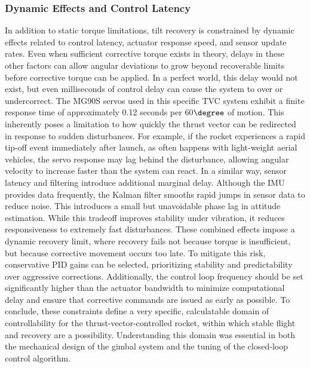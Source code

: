 \subsubsection{Dynamic Effects and Control Latency}

In addition to static torque limitations, tilt recovery is constrained by dynamic effects related to control latency, actuator response speed, and sensor update rates. Even when sufficient corrective torque exists in theory, delays in these other factors can allow angular deviations to grow beyond recoverable limits before corrective torque can be applied. In a perfect world, this delay would not exist, but even milliseconds of control delay can cause the system to over or undercorrect. 
The MG90S servos used in this specific TVC system exhibit a finite response time of approximately 0.12 seconds per 60$\degree$ of motion. This inherently poses a limitation to how quickly the thrust vector can be redirected in response to sudden disturbances. For example, if the rocket experiences a rapid tip-off event immediately after launch, as often happens with light-weight aerial vehicles, the servo response may lag behind the disturbance, allowing angular velocity to increase faster than the system can react. 
In a similar way, sensor latency and filtering introduce additional marginal delay. Although the IMU provides data frequently, the Kalman filter smooths rapid jumps in sensor data to reduce noise. This introduces a small but unavoidable phase lag in attitude estimation. While this tradeoff improves stability under vibration, it reduces responsiveness to extremely fast disturbances.
These combined effects impose a dynamic recovery limit, where recovery fails not because torque is insufficient, but because corrective movement occurs too late. To mitigate this risk, conservative PID gains can be selected, prioritizing stability and predictability over aggressive corrections. Additionally, the control loop frequency should be set significantly higher than the actuator bandwidth to minimize computational delay and ensure that corrective commands are issued as early as possible. 
To conclude, these constraints define a very specific, calculatable domain of controllability for the thrust-vector-controlled rocket, within which stable flight and recovery are a possibility. Understanding this domain was essential in both the mechanical design of the gimbal system and the tuning of the closed-loop control algorithm.